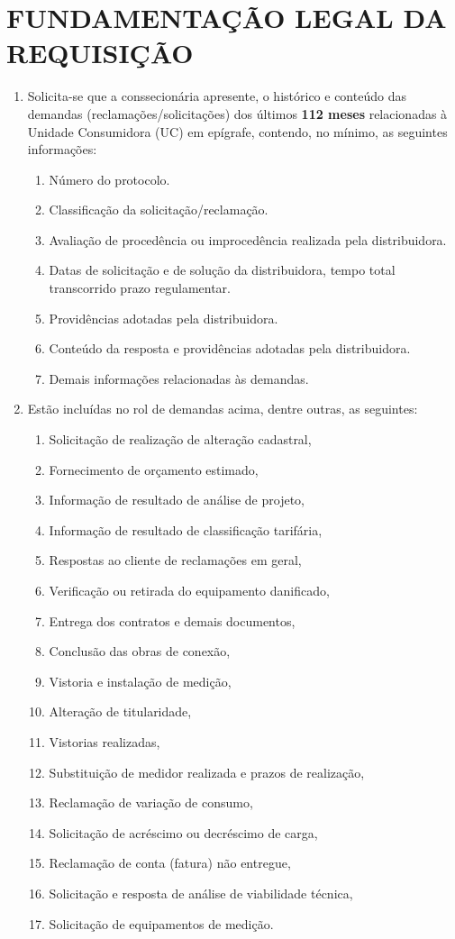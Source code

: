 \documentclass[11pt,a4paper]{article}
\begin{document}
\section{FUNDAMENTAÇÃO LEGAL DA REQUISIÇÃO}

\begin{enumerate}[resume]
\item Solicita-se que a conssecionária apresente, o histórico e conteúdo das demandas (reclamações/solicitações) dos últimos \textbf{112 meses} relacionadas à Unidade Consumidora (UC) em epígrafe, contendo, no mínimo, as seguintes informações:  
  \begin{enumerate}
    \item Número do protocolo.  
    \item Classificação da solicitação/reclamação.  
    \item Avaliação de procedência ou improcedência realizada pela distribuidora.  
    \item Datas de solicitação e de solução da distribuidora, tempo total transcorrido prazo regulamentar.  
    \item Providências adotadas pela distribuidora.  
    \item Conteúdo da resposta e providências adotadas pela distribuidora.  
    \item Demais informações relacionadas às demandas. 
  \end{enumerate}
\item Estão incluídas no rol de demandas acima, dentre outras, as seguintes:
  \begin{enumerate}
    \item Solicitação de realização de alteração cadastral,
    \item Fornecimento de orçamento estimado,
    \item Informação de resultado de análise de projeto,
    \item Informação de resultado de classificação tarifária,
    \item Respostas ao cliente de reclamações em geral,
    \item Verificação ou retirada do equipamento danificado,
    \item Entrega dos contratos e demais documentos,
    \item Conclusão das obras de conexão,
    \item Vistoria e instalação de medição,
    \item Alteração de titularidade,
    \item Vistorias realizadas,
    \item Substituição de medidor realizada e prazos de realização,
    \item Reclamação de variação de consumo,
    \item Solicitação de acréscimo ou decréscimo de carga,
    \item Reclamação de conta (fatura) não entregue,
    \item Solicitação e resposta de análise de viabilidade técnica,
    \item Solicitação de equipamentos de medição.
  \end{enumerate}


\end{enumerate}
\end{document}
